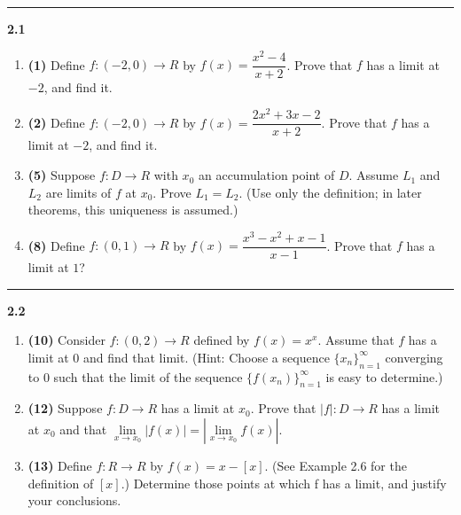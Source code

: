 \documentclass[fleqn]{article}
\begin{document}
  \rule{15cm}{2pt}

  \textbf{2.1}
  \begin{enumerate}
    \item \textbf{(1)} Define $f: (-2, 0) \longrightarrow R$ by $f(x)=\dfrac{x^2-4}{x+2}$. Prove that $f$ has a limit 
    at $-2$, and find it.

        
    
    
    \item \textbf{(2)} Define $f: (-2, 0) \longrightarrow R$ by $f(x)=\dfrac{2x^2+3x-2}{x+2}$. Prove that $f$ has a limit 
    at $-2$, and find it.

        


    \item \textbf{(5)} Suppose $f: D \longrightarrow R$ with $x_0$ an accumulation point of $D$. Assume $L_1$ and $L_2$ 
    are limits of $f$ at $x_0$. Prove $L_1=L_2$. (Use only the definition; in later theorems, this uniqueness is
    assumed.) 

        


    \item \textbf{(8)} Define $f: (0, 1) \longrightarrow R$ by $f(x)=\dfrac{x^3-x^2+x-1}{x-1}$. Prove that $f$ has a limit at $1$?

        

  \end{enumerate}

  \rule{15cm}{2pt}

  \textbf{2.2}
  \begin{enumerate}
    \item \textbf{(10)} Consider $f: (0,2) \longrightarrow R$ defined by $f(x)=x^x$. Assume that $f$ has a limit at $0$ and find that limit.
    (Hint: Choose a sequence $\{x_n\}_{n=1}^{\infty}$ converging to $0$ such that the limit of the
    sequence $\{f(x_n)\}_{n=1}^{\infty}$ is easy to determine.)

        


    \item \textbf{(12)} Suppose $f: D \longrightarrow R$ has a limit at $x_0$. Prove that $|f|: D \longrightarrow R$ has 
    a limit at $x_0$ and that $\lim\limits_{x \to x_0} |f(x)|=|\lim\limits_{x \to x_0} f(x)|$.

        


    \item \textbf{(13)} Define $f: R \longrightarrow R$ by $f(x)=x-[x]$. (See Example 2.6 for the definition 
    of $[x]$.) Determine those points at which f has a limit, and justify your conclusions.

        

  \end{enumerate}
\end{document}
